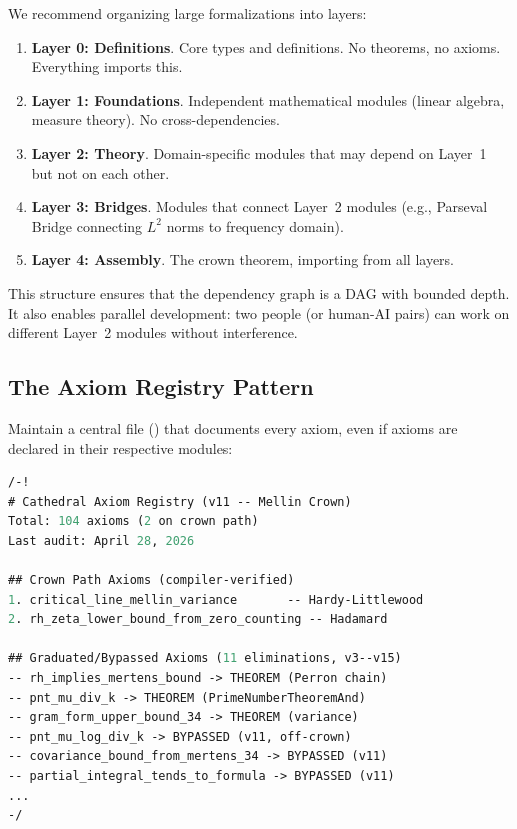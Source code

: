 \documentclass[11pt,a4paper]{article}
\begin{document}
We recommend organizing large formalizations into layers:

\begin{enumerate}
  \item \textbf{Layer 0: Definitions}. Core types and definitions.
    No theorems, no axioms. Everything imports this.
  \item \textbf{Layer 1: Foundations}. Independent mathematical
    modules (linear algebra, measure theory). No cross-dependencies.
  \item \textbf{Layer 2: Theory}. Domain-specific modules that may
    depend on Layer~1 but not on each other.
  \item \textbf{Layer 3: Bridges}. Modules that connect Layer~2
    modules (e.g., Parseval Bridge connecting $L^2$ norms to
    frequency domain).
  \item \textbf{Layer 4: Assembly}. The crown theorem, importing
    from all layers.
\end{enumerate}

This structure ensures that the dependency graph is a DAG with
bounded depth. It also enables parallel development: two people
(or human-AI pairs) can work on different Layer~2 modules without
interference.

\subsection{The Axiom Registry Pattern}

Maintain a central file () that documents every
axiom, even if axioms are declared in their respective modules:

\begin{lstlisting}[language=ML,caption={Axiom registry pattern}]
/-!
# Cathedral Axiom Registry (v11 -- Mellin Crown)
Total: 104 axioms (2 on crown path)
Last audit: April 28, 2026

## Crown Path Axioms (compiler-verified)
1. critical_line_mellin_variance       -- Hardy-Littlewood
2. rh_zeta_lower_bound_from_zero_counting -- Hadamard

## Graduated/Bypassed Axioms (11 eliminations, v3--v15)
-- rh_implies_mertens_bound -> THEOREM (Perron chain)
-- pnt_mu_div_k -> THEOREM (PrimeNumberTheoremAnd)
-- gram_form_upper_bound_34 -> THEOREM (variance)
-- pnt_mu_log_div_k -> BYPASSED (v11, off-crown)
-- covariance_bound_from_mertens_34 -> BYPASSED (v11)
-- partial_integral_tends_to_formula -> BYPASSED (v11)
...
-/
\end{lstlisting}
\end{document}
